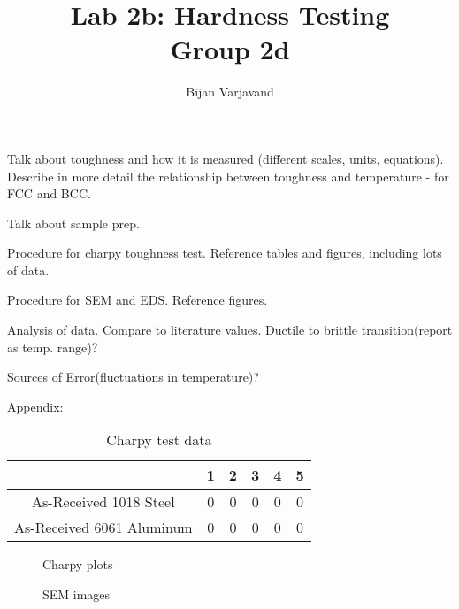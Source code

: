 \documentclass{article}
\author{Bijan Varjavand}
\title{Lab 2b: Hardness Testing\\Group 2d}
\begin{document}
\maketitle

\clearpage

Talk about toughness and how it is measured (different scales, units, equations). Describe in more detail the relationship between toughness and temperature - for FCC and BCC.

Talk about sample prep.

Procedure for charpy toughness test. Reference tables and figures, including lots of data.

Procedure for SEM and EDS. Reference figures.

Analysis of data. Compare to literature values. Ductile to brittle transition(report as temp. range)?

Sources of Error(fluctuations in temperature)?

\clearpage

Appendix:\\

\begin{table}[h]
\centering
\begin{tabular}{||c | c | c | c | c | c||}
	\hline
	\ 							& 1 & 2 & 3 & 4 & 5\\
	\hline\hline
	As-Received 1018 Steel		& 0 & 0 & 0 & 0 & 0\\
	As-Received 6061 Aluminum	& 0 & 0 & 0 & 0 & 0\\
	\hline
\end{tabular}
\caption{Charpy test data}
\end{table}

\begin{figure}[h]
	\centering
	\caption{Charpy plots}
\end{figure}

\begin{figure}[h]
	\centering
	\caption{SEM images}
\end{figure}
\end{document}
